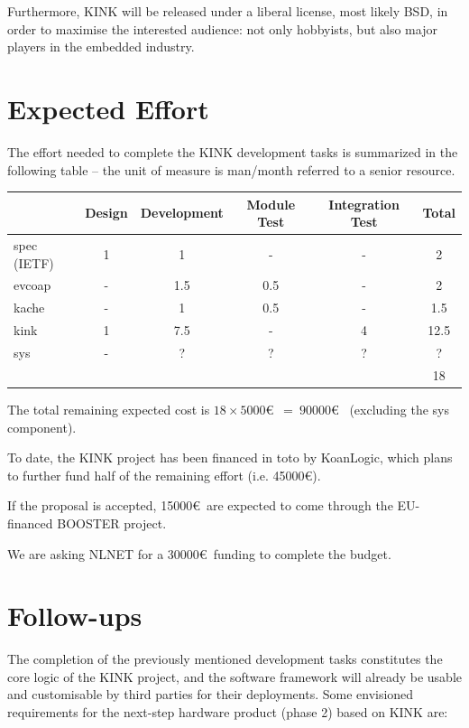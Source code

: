 \documentclass[12pt]{article}
\begin{document}
Furthermore, KINK will be released under a liberal license, most likely BSD, in order to maximise the interested audience: not only hobbyists, but also major players in the embedded industry.

\section{Expected Effort}
The effort needed to complete the KINK development tasks is summarized in the following table -- the unit of measure is man/month referred to a senior resource.

\begin{center}
\begin{tabular}{|l|c|c|c|c|c|}
	\hline 
	  & Design & Development & Module Test & Integration Test & Total \\
	\hline
	spec (IETF) & 1     & 1     & -     & -     & 2 \\
	\hline 
	evcoap      & -     & 1.5   & 0.5   & -     & 2 \\
	\hline
	kache       & -     & 1     & 0.5   & -     & 1.5 \\
	\hline
	kink        & 1     & 7.5   & -     & 4     & 12.5 \\
	\hline
	sys         & -     & ?     & ?     & ?     & ? \footnotemark \\
	\hline
	\multicolumn{5}{|c|}{} & 18 \\
	\hline
\end{tabular}
\end{center}

The total remaining expected cost is $18 \times 5000$\euro~$=~90000$\euro~ (excluding the sys component).

To date, the KINK project has been financed in toto by KoanLogic, which plans to further fund half of the remaining effort (i.e. 45000\euro).

If the proposal is accepted, 15000\euro~are expected to come through the EU-financed BOOSTER project.

We are asking NLNET for a 30000\euro~funding to complete the budget.

\section{Follow-ups}

The completion of the previously mentioned development tasks constitutes the core logic of the KINK project, and the software framework will already be usable and customisable by third parties for their deployments. Some envisioned requirements for the next-step hardware product (phase 2) based on KINK are:
\end{document}
